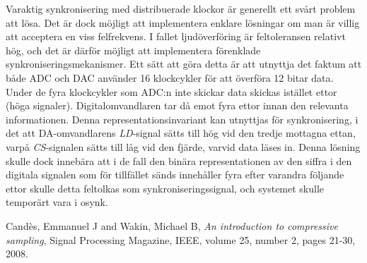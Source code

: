 \documentclass[a4paper,10pt]{article}
\begin{document}
Varaktig synkronisering med distribuerade klockor är generellt ett svårt problem 
att lösa. Det är dock möjligt att implementera enklare lösningar om man är
villig att acceptera en viss felfrekvens. I fallet ljudöverföring är 
feltoleransen relativt hög, och det är därför möjligt att implementera 
förenklade synkroniseringsmekanismer. Ett sätt att göra detta är att utnyttja 
det faktum att både ADC och DAC använder 16 klockcykler för att överföra 12 
bitar data. Under de fyra klockcykler som ADC:n inte skickar data skickas 
istället ettor (höga signaler). Digitalomvandlaren tar då emot fyra ettor innan 
den relevanta informationen. Denna representationsinvariant kan utnyttjas för
synkronisering, i det att DA-omvandlarens \emph{LD}-signal sätts till hög vid 
den tredje mottagna ettan, varpå \emph{CS}-signalen sätts till låg vid den 
fjärde, varvid data läses in. Denna lösning skulle dock innebära att i de fall
den binära representationen av den siffra i den digitala signalen som 
för tillfället sänds innehåller fyra efter varandra följande ettor skulle detta feltolkas som synkroniseringssignal, och systemet skulle temporärt vara i osynk.

\begin{thebibliography}{hejhej}

    {Cand{\`e}s, Emmanuel J and Wakin, Michael B,
    \emph{An introduction to compressive sampling},
    Signal Processing Magazine, IEEE,
    volume 25,
    number 2,
    pages 21-30,
    2008.
}
\end{thebibliography}
\end{document}
